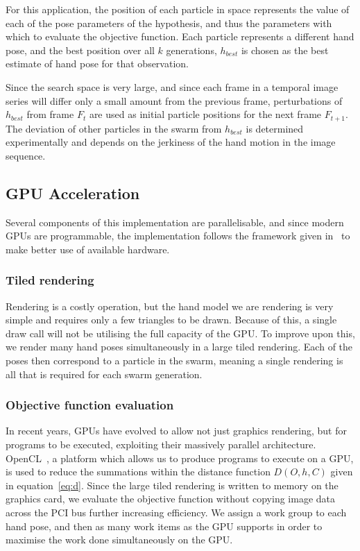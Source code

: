 \documentclass[10pt,a4paper,notitlepage,twocolumn]{report}
\begin{document}
For this application, the position of each particle in space represents the value of each of the pose parameters of the hypothesis, and thus the parameters with which to evaluate the objective function.  Each particle represents a different hand pose, and the best position over all $k$ generations, $h_{best}$ is chosen as the best estimate of hand pose for that observation.

Since the search space is very large, and since each frame in a temporal image series will differ only a small amount from the previous frame, perturbations of $h_{best}$ from frame $F_t$ are used as initial particle positions for the next frame $F_{t+1}$.  The deviation of other particles in the swarm from $h_{best}$ is determined experimentally and depends on the jerkiness of the hand motion in the image sequence. 

\subsection{GPU Acceleration}

Several components of this implementation are parallelisable, and since modern GPUs are programmable, the implementation follows the framework given in~\cite{kyriazis2011} to make better use of available hardware.

\subsubsection{Tiled rendering}

Rendering is a costly operation, but the hand model we are rendering is very simple and requires only a few triangles to be drawn.  Because of this, a single draw call will not be utilising the full capacity of the GPU.  To improve upon this, we render many hand poses simultaneously in a large tiled rendering.  Each of the poses then correspond to a particle in the swarm, meaning a single rendering is all that is required for each swarm generation.

\subsubsection{Objective function evaluation}

In recent years, GPUs have evolved to allow not just graphics rendering, but for programs to be executed, exploiting their massively parallel architecture.  OpenCL~\cite{opencl1.2spec}, a platform which allows us to produce programs to execute on a GPU, is used to reduce the summations within the distance function $D(O, h, C)$ given in equation~\ref{eq:d}.  Since the large tiled rendering is written to memory on the graphics card, we evaluate the objective function without copying image data across the PCI bus further increasing efficiency.  We assign a work group to each hand pose, and then as many work items as the GPU supports in order to maximise the work done simultaneously on the GPU.
\end{document}
